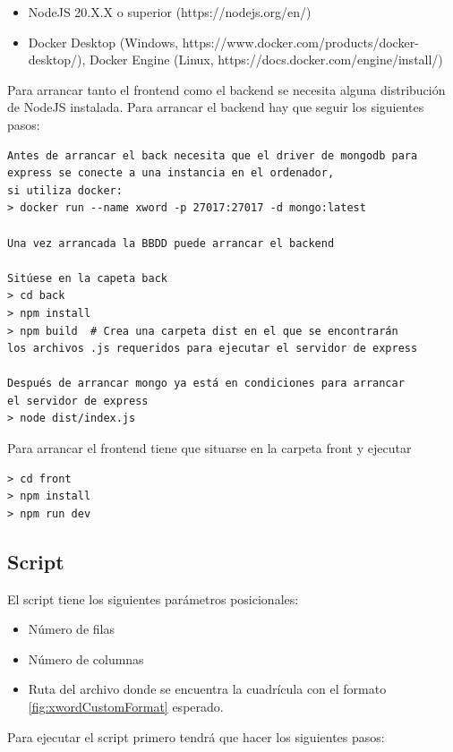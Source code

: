 \documentclass[12pt, a4paper]{article}
\begin{document}
\begin{itemize}
	\item NodeJS 20.X.X o superior (https://nodejs.org/en/)
	\item Docker Desktop (Windows, https://www.docker.com/products/docker-desktop/),
	Docker Engine (Linux, https://docs.docker.com/engine/install/)
\end{itemize}

Para arrancar tanto el frontend como el backend se necesita alguna distribución
de NodeJS instalada. Para arrancar el backend hay que seguir los siguientes pasos:

\begin{verbatim}
Antes de arrancar el back necesita que el driver de mongodb para
express se conecte a una instancia en el ordenador,
si utiliza docker:
> docker run --name xword -p 27017:27017 -d mongo:latest

Una vez arrancada la BBDD puede arrancar el backend
	
Sitúese en la capeta back
> cd back
> npm install
> npm build  # Crea una carpeta dist en el que se encontrarán
los archivos .js requeridos para ejecutar el servidor de express

Después de arrancar mongo ya está en condiciones para arrancar
el servidor de express
> node dist/index.js
\end{verbatim}

Para arrancar el frontend tiene que situarse en la carpeta front y ejecutar

\begin{verbatim}
> cd front
> npm install
> npm run dev
\end{verbatim}

\subsection{Script}

El script tiene los siguientes parámetros posicionales:

\begin{itemize}
	\item Número de filas
	\item Número de columnas
	\item Ruta del archivo donde se encuentra la cuadrícula con el formato
	\ref{fig:xwordCustomFormat} esperado.
\end{itemize}

Para ejecutar el script primero tendrá que hacer los siguientes pasos:
\end{document}
